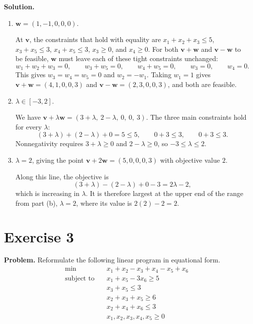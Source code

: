 \documentclass[11pt]{article}
\begin{document}
\medskip
\noindent\textbf{Solution.}
\begin{enumerate}[label=(\alph*)]
  \item $\mathbf{w} = (1, -1, 0, 0, 0)$.

  At $\mathbf{v}$, the constraints that hold with equality are $x_1 + x_2 + x_3 \le 5$, $x_3 + x_5 \le 3$, $x_4 + x_5 \le 3$, $x_3 \ge 0$, and $x_4 \ge 0$. For both $\mathbf{v} + \mathbf{w}$ and $\mathbf{v} - \mathbf{w}$ to be feasible, $\mathbf{w}$ must leave each of these tight constraints unchanged:
  \[
  w_1 + w_2 + w_3 = 0, \qquad
  w_3 + w_5 = 0, \qquad
  w_4 + w_5 = 0, \qquad
  w_3 = 0, \qquad
  w_4 = 0.
  \]
  This gives $w_3 = w_4 = w_5 = 0$ and $w_2 = -w_1$. Taking $w_1 = 1$ gives $\mathbf{v} + \mathbf{w} = (4, 1, 0, 0, 3)$ and $\mathbf{v} - \mathbf{w} = (2, 3, 0, 0, 3)$, and both are feasible.

  \item $\lambda \in [-3, 2]$.

  We have $\mathbf{v} + \lambda \mathbf{w} = (3 + \lambda,\ 2 - \lambda,\ 0,\ 0,\ 3)$. The three main constraints hold for every $\lambda$:
  \[
  (3 + \lambda) + (2 - \lambda) + 0 = 5 \le 5, \qquad
  0 + 3 \le 3, \qquad
  0 + 3 \le 3.
  \]
  Nonnegativity requires $3 + \lambda \ge 0$ and $2 - \lambda \ge 0$, so $-3 \le \lambda \le 2$.

  \item $\lambda = 2$, giving the point $\mathbf{v} + 2\mathbf{w} = (5, 0, 0, 0, 3)$ with objective value $2$.

  Along this line, the objective is
  \[
  (3 + \lambda) - (2 - \lambda) + 0 - 3 = 2\lambda - 2,
  \]
  which is increasing in $\lambda$. It is therefore largest at the upper end of the range from part (b), $\lambda = 2$, where its value is $2(2) - 2 = 2$.
\end{enumerate}

\clearpage
\section*{Exercise 3}

\noindent\textbf{Problem.}
Reformulate the following linear program in equational form.
\begin{align*}
\min\quad & x_1 + x_2 - x_3 + x_4 - x_5 + x_6 \\
\text{subject to}\quad & x_1 + x_5 - 3x_6 \ge 5 \\
& x_3 + x_5 \le 3 \\
& x_2 + x_3 + x_5 \ge 6 \\
& x_2 + x_4 + x_6 \le 3 \\
& x_1, x_2, x_3, x_4, x_5 \ge 0
\end{align*}
\end{document}
